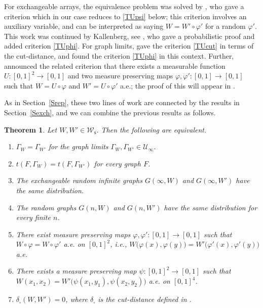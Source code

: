 \documentclass[11pt,reqno,tbtags]{amsart}
\numberwithin{equation}{section}
\newtheorem{theorem}{Theorem}[section]
\theoremstyle{definition}
\theoremstyle{remark}
\newenvironment{romenumerate}{\begin{enumerate}%
 \renewcommand{\labelenumi}{\textup{(\roman{enumi})}}%
 \renewcommand{\theenumi}{\textup{(\roman{enumi})}}%
 }{\end{enumerate}}
\newcommand{\refS}[1]{Section~\ref{#1}}
\newcommand\bigpar[1]{\bigl(#1\bigr)}
\newcommand\ie{i.e.\spacefactor=1000}
\newcommand{\as}{a.s.\spacefactor=1000}
\newcommand{\aex}{a.e.\spacefactor=1000}
\newcommand\gd{\delta}
\newcommand\gf{\varphi}
\newcommand\gG{\Gamma}
\newcommand\cU{{\mathcal U}}
\newcommand\cW{\mathcal W}
\renewcommand{\=}{:=}
\newcommand\oi{[0,1]}
\newcommand{\cuoo}{\cU_\infty}
\newcommand{\dcut}{\gd_\square}
\newcommand{\exch}{exchangeable}
\newcommand{\cws}{\cW_{\mathsf s}}
\newcommand{\W}[1]{W\circ#1}
\newcommand{\uoi}{U(0,1)}
\begin{document}
For \exch{} arrays, the equivalence problem was solved by
\citet{Hoover}, who gave a criterion which in our case reduces to \ref{TUpsi}
below; this criterion involves an auxiliary variable, and can
be interpreted as saying $W=W'\circ\gf'$ for a random $\gf'$.
This work was continued by Kallenberg, see \cite{Kallenberg:exch}, who
gave a probabilistic proof and added criterion \ref{TUphi}. For graph
limits, 
\citet{BCL1} gave the criterion \ref{TUcut} in terms of the cut-distance,
and \citet{BR} found the criterion \ref{TUphi} in this context.
Further,
\citet{BCL1} announced the related criterion that there exists a 
measurable function $U:\oi^2\to\oi$ and two measure preserving maps
$\gf,\gf':\oi\to\oi$ such that $W=U\circ\gf$ and $W'=U\circ\gf'$ a.e.;
the proof of this will appear in \cite{BCL:unique}.

As in \refS{Srep}, these two lines of work are connected by the
results in \refS{Sexch}, and we can combine the previous results as
follows.

\begin{theorem}\label{TU}
  Let $W,W'\in\cws$. Then the following are equivalent.
  \begin{romenumerate}
\item\label{TUgg}
$\gG_W=\gG_{W'}$ for the graph limits $\gG_W,\gG_{W'}\in\cuoo$.	
\item\label{TUt}
$t(F,\gG_W)=t(F,\gG_{W'})$ for every graph $F$.
\item\label{TUgoo}
The \exch{} random infinite graphs $G(\infty,W)$ and $G(\infty,W')$
have the same distribution.
\item\label{TUgn}
The random graphs $G(n,W)$ and $G(n,W')$
have the same distribution for every finite $n$.
\item\label{TUphi}
There exist measure preserving maps $\gf,\gf':\oi\to\oi$ such that
$\W\gf=\W{\gf'}$ \aex{} on $\oi^2$, \ie, 
$W\bigpar{\gf(x),\gf(y)}=W'\bigpar{\gf'(x),\gf'(y)}$
a.e.
\item\label{TUpsi}
There exists a measure preserving map $\psi:\oi^2\to\oi$ such that
$W(x_1,x_2)=W'\bigpar{\psi(x_1,y_1),\psi(x_2,y_2)}$ \aex{} on $\oi^4$.
\item\label{TUcut}
$\dcut(W,W')=0$, where $\dcut$ is the cut-distance defined in \cite{BCL1}.
  \end{romenumerate}
\end{theorem}
\end{document}

